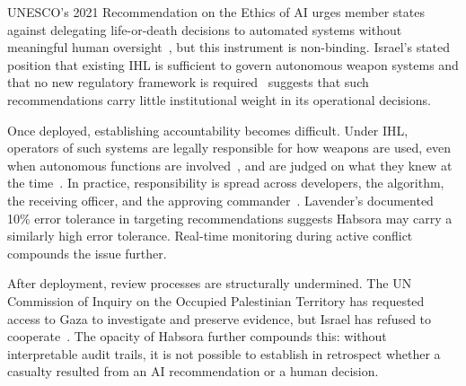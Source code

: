 UNESCO's 2021 Recommendation on the Ethics of AI urges member states against delegating life-or-death decisions to automated systems without meaningful human oversight~\citep{unesco2021recommendation}, but this instrument is non-binding. Israel's stated position that existing IHL is sufficient to govern autonomous weapon systems and that no new regulatory framework is required~\citep{israel_laws_2024, automatedresearch_israel} suggests that such recommendations carry little institutional weight in its operational decisions.

Once deployed, establishing accountability becomes difficult. Under IHL, operators of such systems are legally responsible for how weapons are used, even when autonomous functions are involved~\citep{icrc_api_article86_1977}, and are judged on what they knew at the time~\citep{henckaerts2005customary}. In practice, responsibility is spread across developers, the algorithm, the receiving officer, and the approving commander~\citep{aimag.v40i1.2848}. Lavender's documented 10\% error tolerance in targeting recommendations suggests Habsora may carry a similarly high error tolerance. Real-time monitoring during active conflict compounds the issue further.

After deployment, review processes are structurally undermined. The UN Commission of Inquiry on the Occupied Palestinian Territory has requested access to Gaza to investigate and preserve evidence, but Israel has refused to cooperate~\citep{uncoiopt_2024}. The opacity of Habsora further compounds this: without interpretable audit trails, it is not possible to establish in retrospect whether a casualty resulted from an AI recommendation or a human decision.